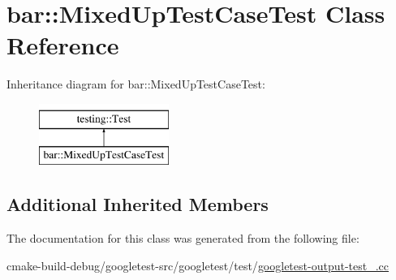 \hypertarget{classbar_1_1MixedUpTestCaseTest}{}\section{bar\+::Mixed\+Up\+Test\+Case\+Test Class Reference}
\label{classbar_1_1MixedUpTestCaseTest}
Inheritance diagram for bar\+::Mixed\+Up\+Test\+Case\+Test\+:\begin{figure}[H]
\begin{center}
\leavevmode
\includegraphics[height=2.000000cm]{classbar_1_1MixedUpTestCaseTest}
\end{center}
\end{figure}
\subsection*{Additional Inherited Members}


The documentation for this class was generated from the following file\+:\begin{DoxyCompactItemize}
\item 
cmake-\/build-\/debug/googletest-\/src/googletest/test/\mbox{\hyperlink{googletest-output-test___8cc}{googletest-\/output-\/test\+\_\+.\+cc}}\end{DoxyCompactItemize}
